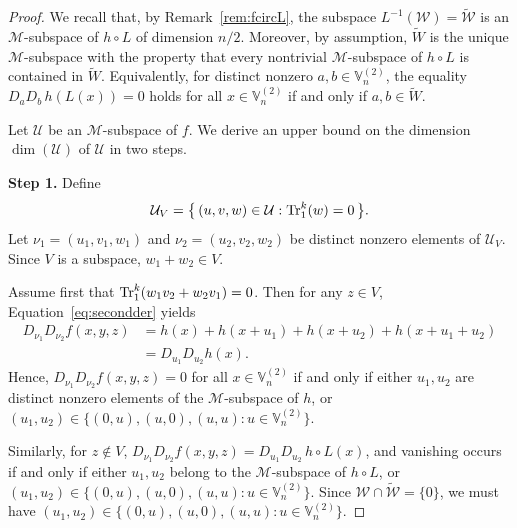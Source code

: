 \documentclass[12pt]{article}
\theoremstyle{plain}
\theoremstyle{definition}
\newcommand{\V}{\mathbb{V}}
\newcommand{\Tr}{{\rm Tr}}
\begin{document}
	
	\begin{proof}
		We recall that, by Remark~\ref{rem:fcircL}, the subspace
		\(L^{-1}(\mathcal{W}) = \widetilde{\mathcal{W}}\) is an \(\mathcal{M}\)-subspace of
		\(h \circ L\) of dimension \(n/2\).
		Moreover, by assumption, \(\widetilde{W}\) is the unique
		\(\mathcal{M}\)-subspace with the property that every nontrivial
		\(\mathcal{M}\)-subspace of \(h\circ L\) is contained in \(\widetilde{W}\).
		Equivalently, for {distinct} nonzero
		\({a},{b}\in \V_n^{(2)}\), the equality $D_{{a}}D_{{b}} \, h (L (x))=0$ holds for all $x\in \V_n^{(2)}$
		if and only if \({a},{b}\in \widetilde{W}\).
		
		\medskip
		
		Let \(\mathcal{U}\) be an \(\mathcal{M}\)-subspace of \(f\).
		We derive an upper bound on the dimension \(\dim(\mathcal{U})\) of $\mathcal{U}$ in two steps.
		
		\medskip
		\noindent\textbf{Step 1.}
		Define
		\begin{equation}\label{eq:UV}
			\mathcal{U}_V
			=
			\bigl\{\,
			(u,v,w)\in \mathcal{U} : \Tr_1^k(w)=0
			\,\bigr\}.
		\end{equation}
		Let
		\(\nu_1=(u_1,v_1,w_1)\) and \(\nu_2=(u_2,v_2,w_2)\)
		be distinct nonzero elements of \(\mathcal{U}_V\).
		Since \(V\) is a subspace, \(w_1+w_2\in V\).
		
		Assume first that
		\(\Tr_1^k(w_1v_2+w_2v_1)=0\).
		Then for any \(z\in V\),
		Equation~\eqref{eq:secondder} yields
		\begin{align*}
			D_{\nu_1}D_{\nu_2}f(x,y,z)
			&= h(x)+h(x+u_1)+h(x+u_2)+h(x+u_1+u_2) \\
			&= D_{u_1}D_{u_2}h(x).
		\end{align*}
		Hence,
		\(D_{\nu_1}D_{\nu_2}f(x,y,z)=0\) for all \(x\in \V_n^{(2)}\)
		if and only if either
		\(u_1,u_2\) are distinct nonzero elements of the
		\(\mathcal{M}\)-subspace of \(h\), or $(u_1,u_2)\in \{(0,u),(u,0),(u,u):u\in \V_n^{(2)}\}$.
		
		Similarly, for \(z\notin V\), $D_{\nu_1}D_{\nu_2}f(x,y,z)
		= D_{u_1}D_{u_2}\, h\circ L(x)$,
		and vanishing occurs if and only if either
		\(u_1,u_2\) belong to the \(\mathcal{M}\)-subspace of
		\(h\circ L\), or  $(u_1,u_2)\in \{(0,u),(u,0),(u,u):u\in \V_n^{(2)}\}$.
		Since \(\mathcal{W}\cap \widetilde{\mathcal{W}}=\{0\}\),
		we must have $(u_1,u_2)\in \{(0,u),(u,0),(u,u):u\in \V_n^{(2)}\}$.
		

\end{proof}
\end{document}

